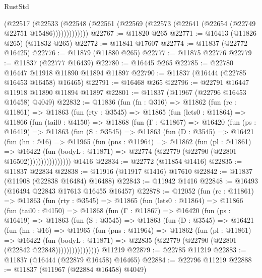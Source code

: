 \begin{lexlean}{RustStd}
\begin{coremodule}
            (@22517
              (@22533
                (@22548 (@22561 (@22569 (@22573 (@22641 (@22654 (@22749 @22751 @15486)))))))))))))
@22767 := @11820 @265
@22771 := @16413 (@11826 @265) (@11832 @265)
@22772 := @11841 @17607
@22774 := @11837 (@22772 @16425)
@22776 := @11879 (@11880 @265)
@22777 := @11875 @22776
@22779 := @11837 (@22777 @16439)
@22780 := @16445 @265
@22785 := @22780 @16447 @11918 @11890 @11894 @11897
@22790 := @11837 (@16444 (@22785 @16453 @16458) @16465)
@22791 := @16468 @265
@22796 := @22791 @16447 @11918 @11890 @11894 @11897
@22801 := @11837 (@11967 (@22796 @16453 @16458) @4049)
@22832 := @11836
    (fun (fn : @316) =>
    @11862
      (fun (rc : @11861) =>
      @11863
        (fun (rty : @3545) =>
        @11865
          (fun (lets0 : @11864) =>
          @11866
            (fun (tail0 : @4150) =>
            @11868
              (fun (Γ : @11867) =>
              @16420
                (fun (ps : @16419) =>
                @11863
                  (fun (S : @3545) =>
                  @11863
                    (fun (D : @3545) =>
                    @16421
                      (fun (hn : @16) =>
                      @11965
                        (fun (pns : @11964) =>
                        @11862
                          (fun (pl : @11861) =>
                          @16422
                            (fun (bodyL : @11871) =>
                            @22774 (@22779 (@22790 (@22801 @16502))))))))))))))))
    @1416
@22834 := @22772 (@11854 @1416)
@22835 := @11837 @22834
@22838 := @11916 (@11917 @1416) @17610
@22842 := @11837 (@11908 (@22838 @16484) @16488)
@22843 := @11942 @1416
@22848 := @16493 (@16494 @22843 @17613 @16455 @16457)
@22878 := @12052
    (fun (rc : @11861) =>
    @11863
      (fun (rty : @3545) =>
      @11865
        (fun (lets0 : @11864) =>
        @11866
          (fun (tail0 : @4150) =>
          @11868
            (fun (Γ : @11867) =>
            @16420
              (fun (ps : @16419) =>
              @11863
                (fun (S : @3545) =>
                @11863
                  (fun (D : @3545) =>
                  @16421
                    (fun (hn : @16) =>
                    @11965
                      (fun (pns : @11964) =>
                      @11862
                        (fun (pl : @11861) =>
                        @16422
                          (fun (bodyL : @11871) =>
                          @22835 (@22779 (@22790 (@22801 (@22842 @22848))))))))))))))))
    @11219
@22879 := @22785 @11219
@22883 := @11837 (@16444 (@22879 @16458) @16465)
@22884 := @22796 @11219
@22888 := @11837 (@11967 (@22884 @16458) @4049)

\end{coremodule}
\end{lexlean}
